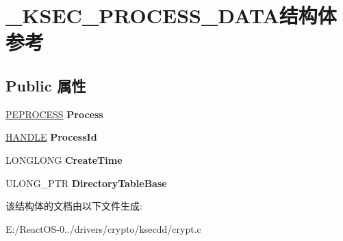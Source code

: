 \hypertarget{struct___k_s_e_c___p_r_o_c_e_s_s___d_a_t_a}{}\section{\+\_\+\+K\+S\+E\+C\+\_\+\+P\+R\+O\+C\+E\+S\+S\+\_\+\+D\+A\+T\+A结构体 参考}
\label{struct___k_s_e_c___p_r_o_c_e_s_s___d_a_t_a}
\subsection*{Public 属性}
\begin{DoxyCompactItemize}
\item 
\mbox{\label{struct___k_s_e_c___p_r_o_c_e_s_s___d_a_t_a_aa8d405ac19a928c2a271feeba5e42350}} 
\hyperlink{struct___e_p_r_o_c_e_s_s}{P\+E\+P\+R\+O\+C\+E\+SS} {\bfseries Process}
\item 
\mbox{\label{struct___k_s_e_c___p_r_o_c_e_s_s___d_a_t_a_a700ba93390ba60eb19b606b696fd6f07}} 
\hyperlink{interfacevoid}{H\+A\+N\+D\+LE} {\bfseries Process\+Id}
\item 
\mbox{\label{struct___k_s_e_c___p_r_o_c_e_s_s___d_a_t_a_aaf6ad59f59cee1e9c4b688dbeaafc1ff}} 
L\+O\+N\+G\+L\+O\+NG {\bfseries Create\+Time}
\item 
\mbox{\label{struct___k_s_e_c___p_r_o_c_e_s_s___d_a_t_a_a659c46d8dbbef0e9dfbc58b0a2345891}} 
U\+L\+O\+N\+G\+\_\+\+P\+TR {\bfseries Directory\+Table\+Base}
\end{DoxyCompactItemize}


该结构体的文档由以下文件生成\+:\begin{DoxyCompactItemize}
\item 
E\+:/\+React\+O\+S-\/0../drivers/crypto/ksecdd/crypt.\+c\end{DoxyCompactItemize}
